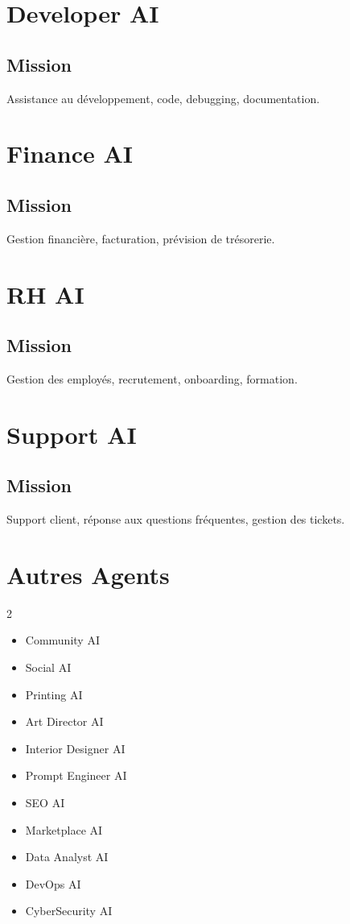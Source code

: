 \documentclass[12pt,a4paper,oneside]{book}
\begin{document}
\chapter{Developer AI}

\section{Mission}
 Assistance au développement, code, debugging, documentation.

\chapter{Finance AI}

\section{Mission}
Gestion financière, facturation, prévision de trésorerie.

\chapter{RH AI}

\section{Mission}
Gestion des employés, recrutement, onboarding, formation.

\chapter{Support AI}

\section{Mission}
Support client, réponse aux questions fréquentes, gestion des tickets.

\chapter{Autres Agents}
\begin{multicols}{2}
\begin{itemize}
\item Community AI
\item Social AI
\item Printing AI
\item Art Director AI
\item Interior Designer AI
\item Prompt Engineer AI
\item SEO AI
\item Marketplace AI
\item Data Analyst AI
\item DevOps AI
\item CyberSecurity AI
\end{itemize}
\end{multicols}
\end{document}
